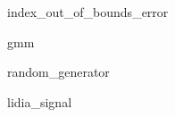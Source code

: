 \begin{class}{index_out_of_bounds_error}
  
\end{class}

\begin{class}{gmm}
  
\end{class}

\begin{class}{random_generator}
  
\end{class}

\begin{class}{lidia_signal}
  
\end{class}

